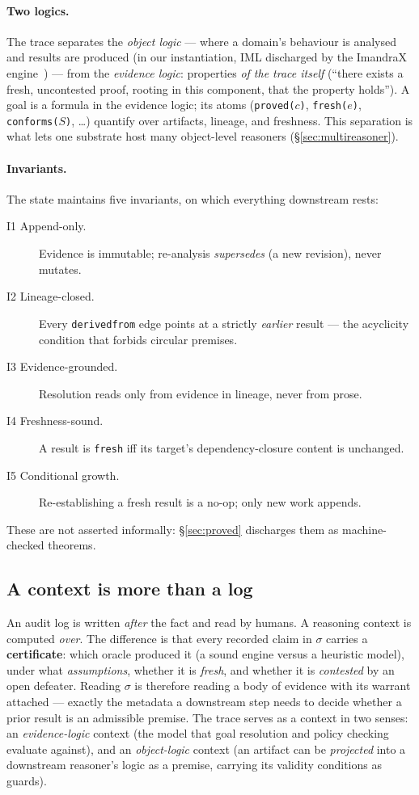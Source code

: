 \documentclass[11pt]{article}
\newcommand{\trace}{\ensuremath{\sigma}}
\newcommand{\codeus}{\textunderscore\penalty100\relax}
\newcommand{\code}[1]{\texttt{\let\_\codeus #1}}
\begin{document}
\paragraph{Two logics.} The trace separates the \emph{object logic} --- where a domain's behaviour is
analysed and results are produced (in our instantiation, IML discharged by the ImandraX
engine~\cite{imandra}) --- from the \emph{evidence logic}: properties \emph{of the trace itself}
(``there exists a fresh, uncontested proof, rooting in this component, that the property holds''). A goal is
a formula in the evidence logic; its atoms (\code{proved($c$)}, \code{fresh($e$)}, \code{conforms($S$)},
\ldots) quantify over artifacts, lineage, and freshness. This separation is what lets one substrate host
many object-level reasoners (\S\ref{sec:multireasoner}).

\paragraph{Invariants.} The state maintains five invariants, on which everything downstream rests:
\begin{description}
\item[I1 Append-only.] Evidence is immutable; re-analysis \emph{supersedes} (a new revision), never mutates.
\item[I2 Lineage-closed.] Every \code{derived\_from} edge points at a strictly \emph{earlier} result ---
the acyclicity condition that forbids circular premises.
\item[I3 Evidence-grounded.] Resolution reads only from evidence in lineage, never from prose.
\item[I4 Freshness-sound.] A result is \code{fresh} iff its target's dependency-closure content is
unchanged.
\item[I5 Conditional growth.] Re-establishing a fresh result is a no-op; only new work appends.
\end{description}
These are not asserted informally: \S\ref{sec:proved} discharges them as machine-checked theorems.

\subsection{A context is more than a log}\label{sec:context}

An audit log is written \emph{after} the fact and read by humans. A reasoning context is computed
\emph{over}. The difference is that every recorded claim in \trace{} carries a \textbf{certificate}: which
oracle produced it (a sound engine versus a heuristic model), under what \emph{assumptions}, whether it is
\emph{fresh}, and whether it is \emph{contested} by an open defeater. Reading \trace{} is therefore reading
a body of evidence with its warrant attached --- exactly the metadata a downstream step needs to decide
whether a prior result is an admissible premise. The trace serves as a context in two senses: an
\emph{evidence-logic} context (the model that goal resolution and policy checking evaluate against), and an
\emph{object-logic} context (an artifact can be \emph{projected} into a downstream reasoner's logic as a
premise, carrying its validity conditions as guards).
\end{document}
